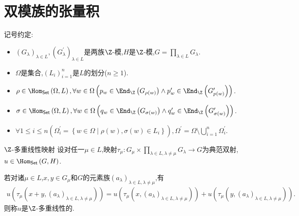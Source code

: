\section{双模族的张量积}

记号约定:

\begin{itemize}
	\item $\left(G_{\lambda}\right)_{\lambda\in L},\left(G_{\lambda}^{\prime}\right)_{\lambda\in L}$是两族$\Z$-模,$H$是$\Z$-模,$G=\prod\limits_{\lambda\in L}G_{\lambda}$.
	\item $\Omega$是集合,$\left(L_{i}\right)_{i=1}^{n}$是$L$的划分($n\geq 1$).
	\item $\rho\in\Hom_{\mathsf{Set}}\left(\Omega,L\right),\forall w\in\Omega\left(p_{w}\in\End_{\Z}\left(G_{\rho\left(w\right)}\right)\wedge p_{w}^{\prime}\in\End_{\Z}\left(G_{p\left(w\right)}^{\prime}\right)\right)$.
	\item $\sigma\in\Hom_{\mathsf{Set}}\left(\Omega,L\right),\forall w\in\Omega\left(q_{w}\in\End_{\Z}\left(G_{\sigma\left(w\right)}\right)\wedge q_{w}^{\prime}\in\End_{\Z}\left(G_{\sigma\left(w\right)}^{\prime}\right)\right)$.
	\item $\forall 1\leq i\leq n\left(\Omega_{i}^{\prime}=\left\{w\in\Omega\middle|\rho\left(w\right),\sigma\left(w\right)\in L_{i}\right\}\right),\Omega^{\prime}=\Omega\setminus\bigcup\limits_{i=1}^{n}\Omega_{i}^{\prime}$.
\end{itemize}

\begin{definition}{$\Z$-多重线性映射}{}
	设对任一$\mu\in L$,映射$\tau_{\mu}:G_{\mu}\times\prod\limits_{\lambda\in L,\lambda\neq\mu}G_{\lambda}\to G$为典范双射,$u\in\Hom_{\mathsf{Set}}\left(G,H\right)$.
	
	若对诸$\mu\in L$,$x,y\in G_{\mu}$和$G$的元素族$\left(a_{\lambda}\right)_{\lambda\in L,\lambda\neq\mu}$,有
	\begin{align*}
		u\left(\tau_{\mu}\left(x+y,\left(a_{\lambda}\right)_{\lambda\in L,\lambda\neq\mu}\right)\right)=u\left(\tau_{\mu}\left(x,\left(a_{\lambda}\right)_{\lambda\in L,\lambda\neq\mu}\right)\right)+u\left(\tau_{\mu}\left(y,\left(a_{\lambda}\right)_{\lambda\in L,\lambda\neq\mu}\right)\right).
	\end{align*}
	则称$u$是$\Z$-多重线性的.
\end{definition}

